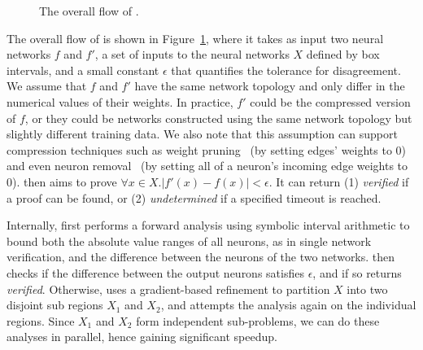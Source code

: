 \begin{figure}[t]
	\centering
\scalebox{1.25}{}
\caption{The overall flow of \Name{}.}
\label{neurodiff:fig:diagram}
\end{figure}


The overall flow of \Name{} is shown in Figure~\ref{neurodiff:fig:diagram},
where it takes as input two neural networks $ f $ and $ f' $, a set of
inputs to the neural networks $ X $ defined by box intervals, and a small
constant $ \epsilon $ that quantifies the tolerance for disagreement. We assume
that $ f $ and $ f' $ have the same network topology and only differ in the
numerical values of their weights. In practice, $ f' $ could be the compressed
version of $ f $, or they could be networks constructed using the same network
topology but slightly different training data. We also note that this
assumption can support compression techniques such as weight
pruning~\cite{HanMD16} (by setting edges' weights to 0) and even neuron
removal~\cite{gokulanathan2019simplifying} (by setting all of a neuron's
incoming edge weights to 0). \Name{} then aims to prove $
\forall
x \in X. |f'(x) - f(x)| < \epsilon $. It can return
(1) \emph{verified} if a proof can be found, or
(2) \emph{undetermined} if a specified timeout is reached.


Internally, \Name{} first performs a forward analysis using symbolic
interval arithmetic to bound both the absolute value ranges of all
neurons, as in single network verification, and the difference between
the neurons of the two networks. \Name{} then checks if the difference
between the output neurons satisfies $ \epsilon $, and if so
returns \emph{verified}. Otherwise,
\Name{} uses a gradient-based refinement to partition $ X
$ into two disjoint sub regions $ X_1 $ and $ X_2 $, and attempts the
analysis again on the individual regions. Since $ X_1 $ and $ X_2 $
form independent sub-problems, we can do these analyses in parallel,
hence gaining significant speedup.


